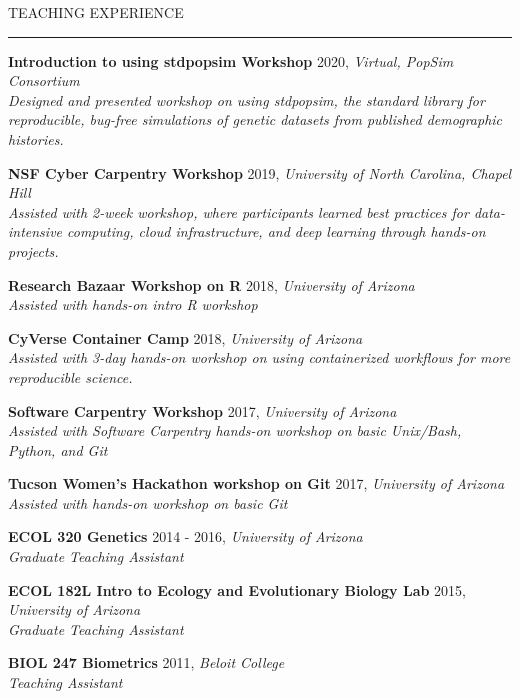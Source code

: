\documentclass{resume} %
\renewenvironment{rSection}[1]{
\sectionskip
\textcolor{RoyalPurple}{\MakeUppercase{#1}}
\sectionlineskip
\hrule
\begin{list}{}{
\setlength{\leftmargin}{1.5em}
}
\item[]
}{
\end{list}
}
\begin{document}
\begin{rSection}{Teaching Experience}

    {\bf Introduction to using stdpopsim Workshop} \hfill 2020, {\em Virtual, PopSim Consortium} \\ 
    {\em Designed and presented workshop on using stdpopsim, the standard library for reproducible, bug-free simulations of genetic datasets from published demographic histories.}

    {\bf NSF Cyber Carpentry Workshop} \hfill 2019, {\em University of North Carolina, Chapel Hill} \\ 
    {\em Assisted with 2-week workshop, where participants learned best practices for data-intensive computing, cloud infrastructure, and deep learning through hands-on projects.}

    {\bf Research Bazaar Workshop on R} \hfill 2018, {\em University of Arizona} \\ 
    {\em Assisted with hands-on intro R workshop}

    {\bf CyVerse Container Camp} \hfill 2018, {\em University of Arizona} \\ 
    {\em Assisted with 3-day hands-on workshop on using containerized workflows for more reproducible science.}

    {\bf Software Carpentry Workshop} \hfill 2017, {\em University of Arizona} \\ 
    {\em Assisted with Software Carpentry hands-on workshop on basic Unix/Bash, Python, and Git}

    {\bf Tucson Women’s Hackathon workshop on Git} \hfill 2017, {\em University of Arizona} \\ 
    {\em Assisted with hands-on workshop on basic Git}

    {\bf ECOL 320 Genetics} \hfill 2014 - 2016, {\em University of Arizona} \\ 
    {\em Graduate Teaching Assistant}

    {\bf ECOL 182L Intro to Ecology and Evolutionary Biology Lab} \hfill 2015, {\em University of Arizona} \\ 
    {\em Graduate Teaching Assistant}

    {\bf BIOL 247 Biometrics} \hfill 2011, {\em Beloit College} \\ 
    {\em Teaching Assistant} 

\end{rSection}

\end{document}
